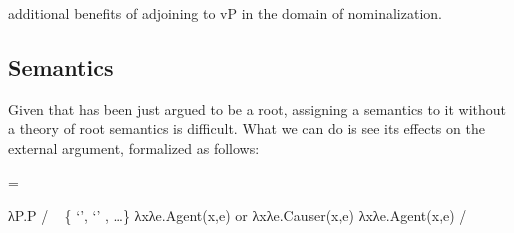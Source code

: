 \begin{exe}
\begin{xlist}
\begin{exe}
\begin{xlist}
\begin{exe}
\begin{xlist}
\begin{exe}
\begin{exe}
\begin{xlist}
\begin{exe}
\begin{xlist}
\begin{exe}
\begin{xlist}
\begin{exe}
\begin{xlist}
\begin{exe}
\begin{xlist}
\begin{exe}
\begin{xlist}
\begin{exe}
\begin{xlist}
\begin{exe}
\begin{xlist}
\begin{exe}
\begin{xlist}
\begin{exe}
\begin{xlist}
\begin{exe}
\begin{xlist}
\begin{exe}
\begin{xlist}
\begin{exe}
\begin{exe}
\begin{xlist}
\begin{exe}
\begin{xlist}
\begin{exe}
\begin{xlist}
\begin{exe}
\begin{xlist}
{\begin{exe}
\begin{xlist}
\begin{exe}
\begin{xlist}
\begin{exe}
\begin{xlist}
\begin{exe}
\begin{xlist}
\begin{xlist}
\begin{xlist}
\begin{exe}
\begin{xlist}
\begin{xlist}
\begin{xlist}
\begin{exe}
\begin{exe}
\begin{xlist}
\begin{exe}
\begin{xlist}
\begin{exe}
\begin{xlist}
\begin{exe}
\begin{xlist}
\begin{exe}
\begin{xlist}
\begin{exe}
\begin{xlist}
\begin{exe}
\begin{exe}
\begin{xlist}
\begin{xlist}
\begin{exe}
\begin{xlist}
\begin{exe}
\begin{xlist}
\begin{exe}
\begin{xlist}
\begin{exe}
\begin{xlist}
\begin{exe}
\begin{xlist}
\begin{exe}
\begin{xlist}
\begin{exe}
\begin{exe}
\begin{xlist}
\begin{exe}
\begin{xlist}
\begin{exe}
\begin{xlist}
additional benefits of adjoining {\va} to vP in the domain of nominalization.

	\subsection{Semantics} \label{voice:va:sem}
Given that {\va} has been just argued to be a root, assigning a semantics to it without a theory of root semantics is difficult. What we can do is see its effects on the external argument, formalized as follows:
 \begin{exe}
 \ex  \label{ex:2n61} =  
 \begin{xlist} 
 	\ex   λP.P \phantom{agent(x,e)xxx} / \trace~ \{  `',  `' , \dots \} 
 	\ex   λxλe.Agent(x,e) or λxλe.Causer(x,e) 
 	\ex   λxλe.Agent(x,e) / \trace~\va 
 \z
\z 

\end{xlist}
\end{exe}
\end{xlist}
\end{exe}
\end{xlist}
\end{exe}
\end{xlist}
\end{exe}
\end{exe}
\end{xlist}
\end{exe}
\end{xlist}
\end{exe}
\end{xlist}
\end{exe}
\end{xlist}
\end{exe}
\end{xlist}
\end{exe}
\end{xlist}
\end{exe}
\end{xlist}
\end{xlist}
\end{exe}
\end{exe}
\end{xlist}
\end{exe}
\end{xlist}
\end{exe}
\end{xlist}
\end{exe}
\end{xlist}
\end{exe}
\end{xlist}
\end{exe}
\end{xlist}
\end{exe}
\end{exe}
\end{xlist}
\end{xlist}
\end{xlist}
\end{exe}
\end{xlist}
\end{xlist}
\end{xlist}
\end{exe}
\end{xlist}
\end{exe}
\end{xlist}
\end{exe}
\end{xlist}
\end{exe}}
\end{xlist}
\end{exe}
\end{xlist}
\end{exe}
\end{xlist}
\end{exe}
\end{xlist}
\end{exe}
\end{exe}
\end{xlist}
\end{exe}
\end{xlist}
\end{exe}
\end{xlist}
\end{exe}
\end{xlist}
\end{exe}
\end{xlist}
\end{exe}
\end{xlist}
\end{exe}
\end{xlist}
\end{exe}
\end{xlist}
\end{exe}
\end{xlist}
\end{exe}
\end{xlist}
\end{exe}
\end{xlist}
\end{exe}
\end{xlist}
\end{exe}
\end{exe}
\end{xlist}
\end{exe}
\end{xlist}
\end{exe}
\end{xlist}
\end{exe}
